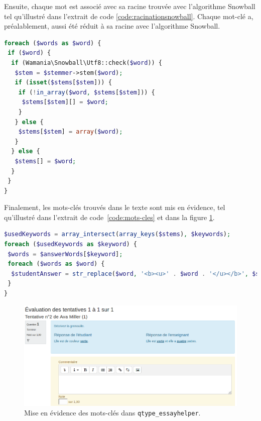 Ensuite, chaque mot est associ\'e avec sa racine trouv\'ee avec l'algorithme Snowball tel qu'illustr\'e dans l'extrait de code \ref{code:racinationsnowball}.
Chaque mot-cl\'e a, pr\'ealablement, aussi \'et\'e r\'eduit \`a sa racine avec l'algorithme Snowball.
\begin{lstfloat}[htbp]
\begin{lstlisting}[language=php,frame=l]
foreach ($words as $word) {
 if ($word) {
  if (Wamania\Snowball\Utf8::check($word)) {
   $stem = $stemmer->stem($word);
   if (isset($stems[$stem])) {
    if (!in_array($word, $stems[$stem])) {
     $stems[$stem][] = $word;
    }
   } else {
    $stems[$stem] = array($word);
   }
  } else {
   $stems[] = $word;
  }
 }
}
\end{lstlisting}
\caption{Racination des mots avec Snowball.}
\label{code:racinationsnowball}
\end{lstfloat}
Finalement, les mots-cl\'es trouv\'es dans le texte sont mis en \'evidence, tel qu'illustr\'e dans l'extrait de code~\ref{code:mots-cles} et dans la figure \ref{dev-correction-screenshot}.
\begin{lstfloat}[htbp]
\begin{lstlisting}[language=php,frame=l]
$usedKeywords = array_intersect(array_keys($stems), $keywords);
foreach ($usedKeywords as $keyword) {
 $words = $answerWords[$keyword];
 foreach ($words as $word) {
  $studentAnswer = str_replace($word, '<b><u>' . $word . '</u></b>', $studentAnswer);
 }
}
\end{lstlisting}
\caption{Mise en \'evidence des mots-cl\'es trouv\'es.}
\label{code:mots-cles}
\end{lstfloat}
\begin{figure}[htbp]
  \includegraphics[scale=0.56]{images/correction-essayhelper.png}
  \caption{Mise en \'evidence des mots-cl\'es dans \texttt{qtype\_essayhelper}.}
  \label{dev-correction-screenshot}
\end{figure}

